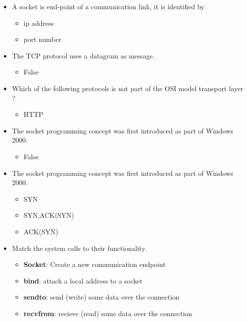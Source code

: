 \documentclass{report}
\begin{document}
    \pagebreak 
    \begin{itemize}
        \item A socket is end-point of a communication link, it is identified by 
            \begin{itemize}
                \item ip address 
                \item port number
            \end{itemize}
        \item  The TCP protocol uses a datagram as message.
            \begin{itemize}
                \item False
            \end{itemize}
        \item Which of the following protocols is not part of the OSI model transport layer ?
            \begin{itemize}
                \item HTTP
            \end{itemize}
        \item The socket programming concept was first introduced as part of Windows 2000.
            \begin{itemize}
                \item False
            \end{itemize}
        \item The socket programming concept was first introduced as part of Windows 2000.
            \begin{itemize}
                \item SYN 
                \item SYN,ACK(SYN) 
                \item ACK(SYN)
            \end{itemize}
        \item Match the system calls to their functionality.
            \begin{itemize}
                \item \textbf{Socket}: Create a new communication endpoint
                \item \textbf{bind}: attach a local address to a socket
                \item \textbf{sendto}: send (write) some data over the connection
                \item \textbf{recvfrom}: recieve (read) some data over the connection

\end{itemize}
\end{itemize}
\end{document}
